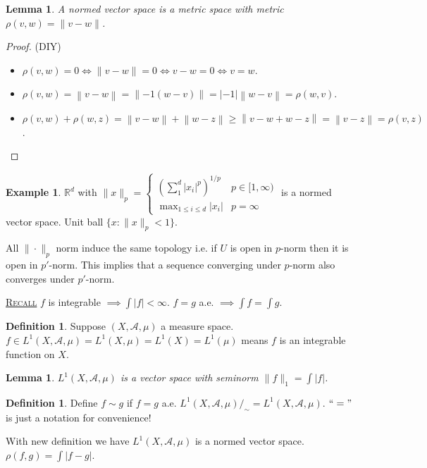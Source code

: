 \documentclass{report}
\newcommand{\R}{\mathbb{R}}
\newcommand{\cA}{\mathcal{A}}
\newcommand{\norm}[1]{\left\| #1 \right\|}
\newcommand{\fancyem}[1]{\underline{\textsc{#1}}}
\newtheorem{lemma}[theorem]{Lemma}
\theoremstyle{definition}
\newtheorem{definition}[theorem]{Definition}
\newtheorem{example}[theorem]{Example}
\theoremstyle{remark}
\begin{document}
\begin{lemma}
	A normed vector space is a metric space with metric $\rho(v, w) = \|v - w\|$.
\end{lemma}
\begin{proof}{(DIY)}
	\begin{itemize}
		\item $\rho(v, w) = 0 \iff \|v - w\| = 0 \iff v - w = 0 \iff v = w$.
		\item $\rho(v, w) = \norm{v - w} = \norm{-1(w - v)} = |-1|\norm{w - v} = \rho(w, v)$.
		\item $\rho(v, w) + \rho(w, z) = \norm{v - w} + \norm{w - z} \geq \norm{v - w + w - z} = \norm{v - z} = \rho(v, z)$. \qedhere
	\end{itemize}
\end{proof}
\begin{example}
	$\R^d$ with $\|x\|_p = \begin{cases}
		\displaystyle \left(\sum_{1}^d |x_i|^p\right)^{1 / p} & p \in [1, \infty) \\
		\displaystyle \max_{1 \leq i \leq d} |x_i| & p = \infty
	\end{cases}$ is a normed vector space.
	Unit ball $\{x: \|x\|_p < 1\}$.
\end{example}
All $\|\cdot\|_p$ norm induce the same topology i.e. if $U$ is open in $p$-norm then it is open in $p'$-norm. This implies that a sequence converging under $p$-norm also converges under $p'$-norm.

\fancyem{Recall} $f$ is integrable $\implies \int|f| < \infty$. $f = g $ a.e. $\implies \int f = \int g$.

\begin{definition} 
	Suppose $(X, \cA, \mu)$ a measure space.\\
	$f \in L^1(X, \cA, \mu) = L^1(X, \mu) = L^1(X) = L^1(\mu)$ means $f$ is an integrable function on $X$.
\end{definition}

\begin{lemma}
	$L^1(X, \cA, \mu)$ is a vector space with seminorm $\displaystyle \|f\|_1 = \int |f|$.
\end{lemma}

\begin{definition}
	Define $f \sim g$ if $f = g$ a.e. 
	$L^1(X, \cA, \mu)/_\sim = L^1(X, \cA, \mu)$.
	$``="$ is just a notation for convenience!
\end{definition}

With new definition we have $L^1(X, \cA, \mu)$ is a normed vector space.
$\displaystyle\rho(f, g) = \int |f - g|$.
\end{document}
